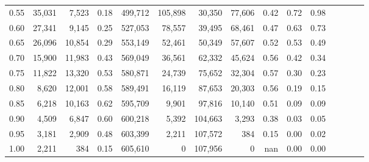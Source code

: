 \begin{tabular}{rrrcrrrrrrrrrrr}
0.55 &  35,031 &   7,523 &                                       0.18 &  499,712 &  105,898 &   30,350 &   77,606 &  0.42 &  0.72 &                         0.98 \\
0.60 &  27,341 &   9,145 &                                       0.25 &  527,053 &   78,557 &   39,495 &   68,461 &  0.47 &  0.63 &                         0.73 \\
0.65 &  26,096 &  10,854 &                                       0.29 &  553,149 &   52,461 &   50,349 &   57,607 &  0.52 &  0.53 &                         0.49 \\
0.70 &  15,900 &  11,983 &                                       0.43 &  569,049 &   36,561 &   62,332 &   45,624 &  0.56 &  0.42 &                         0.34 \\
0.75 &  11,822 &  13,320 &                                       0.53 &  580,871 &   24,739 &   75,652 &   32,304 &  0.57 &  0.30 &                         0.23 \\
0.80 &   8,620 &  12,001 &                                       0.58 &  589,491 &   16,119 &   87,653 &   20,303 &  0.56 &  0.19 &                         0.15 \\
0.85 &   6,218 &  10,163 &                                       0.62 &  595,709 &    9,901 &   97,816 &   10,140 &  0.51 &  0.09 &                         0.09 \\
0.90 &   4,509 &   6,847 &                                       0.60 &  600,218 &    5,392 &  104,663 &    3,293 &  0.38 &  0.03 &                         0.05 \\
0.95 &   3,181 &   2,909 &                                       0.48 &  603,399 &    2,211 &  107,572 &      384 &  0.15 &  0.00 &                         0.02 \\
1.00 &   2,211 &     384 &                                       0.15 &  605,610 &        0 &  107,956 &        0 &   nan &  0.00 &                         0.00 \\
\bottomrule
\end{tabular}
